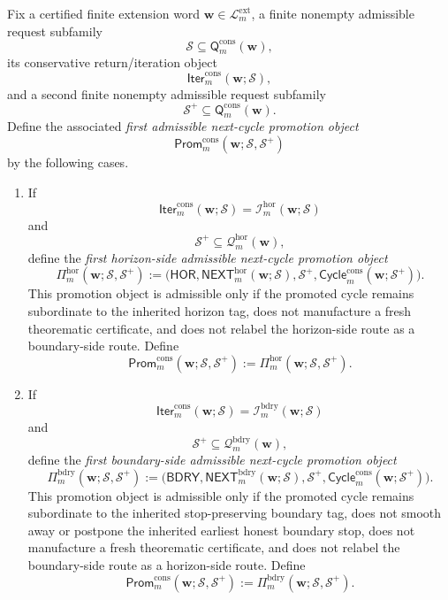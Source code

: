 \begin{definition}
\label{def:first-admissible-next-cycle-promotion-rule}
Fix a certified finite extension word \(\mathbf w\in\mathcal L^{\mathrm{ext}}_{m}\), a finite nonempty admissible request subfamily
\[
  \mathcal S \subseteq \mathsf{Q}^{\mathrm{cons}}_{m}(\mathbf w),
\]
its conservative return/iteration object
\[
  \mathsf{Iter}^{\mathrm{cons}}_{m}(\mathbf w;\mathcal S),
\]
and a second finite nonempty admissible request subfamily
\[
  \mathcal S^{+}\subseteq \mathsf{Q}^{\mathrm{cons}}_{m}(\mathbf w).
\]
Define the associated \emph{first admissible next-cycle promotion object}
\[
  \mathsf{Prom}^{\mathrm{cons}}_{m}(\mathbf w;\mathcal S,\mathcal S^{+})
\]
by the following cases.
\begin{enumerate}[label=(\roman*)]
  \item If
  \[
    \mathsf{Iter}^{\mathrm{cons}}_{m}(\mathbf w;\mathcal S)
    =
    \mathcal I^{\mathrm{hor}}_{m}(\mathbf w;\mathcal S)
  \]
and
\[
  \mathcal S^{+}\subseteq \mathcal Q^{\mathrm{hor}}_{m}(\mathbf w),
\]
define the \emph{first horizon-side admissible next-cycle promotion object}
\[
  \Pi^{\mathrm{hor}}_{m}(\mathbf w;\mathcal S,\mathcal S^{+})
  :=
  \bigl(
    \mathsf{HOR},
    \mathsf{NEXT}^{\mathrm{hor}}_{m}(\mathbf w;\mathcal S),
    \mathcal S^{+},
    \mathsf{Cycle}^{\mathrm{cons}}_{m}(\mathbf w;\mathcal S^{+})
  \bigr).
\]
This promotion object is admissible only if the promoted cycle remains subordinate to the inherited horizon tag, does not manufacture a fresh theorematic certificate, and does not relabel the horizon-side route as a boundary-side route. Define
\[
  \mathsf{Prom}^{\mathrm{cons}}_{m}(\mathbf w;\mathcal S,\mathcal S^{+})
  :=
  \Pi^{\mathrm{hor}}_{m}(\mathbf w;\mathcal S,\mathcal S^{+}).
\]

  \item If
  \[
    \mathsf{Iter}^{\mathrm{cons}}_{m}(\mathbf w;\mathcal S)
    =
    \mathcal I^{\mathrm{bdry}}_{m}(\mathbf w;\mathcal S)
  \]
and
\[
  \mathcal S^{+}\subseteq \mathcal Q^{\mathrm{bdry}}_{m}(\mathbf w),
\]
define the \emph{first boundary-side admissible next-cycle promotion object}
\[
  \Pi^{\mathrm{bdry}}_{m}(\mathbf w;\mathcal S,\mathcal S^{+})
  :=
  \bigl(
    \mathsf{BDRY},
    \mathsf{NEXT}^{\mathrm{bdry}}_{m}(\mathbf w;\mathcal S),
    \mathcal S^{+},
    \mathsf{Cycle}^{\mathrm{cons}}_{m}(\mathbf w;\mathcal S^{+})
  \bigr).
\]
This promotion object is admissible only if the promoted cycle remains subordinate to the inherited stop-preserving boundary tag, does not smooth away or postpone the inherited earliest honest boundary stop, does not manufacture a fresh theorematic certificate, and does not relabel the boundary-side route as a horizon-side route. Define
\[
  \mathsf{Prom}^{\mathrm{cons}}_{m}(\mathbf w;\mathcal S,\mathcal S^{+})
  :=
  \Pi^{\mathrm{bdry}}_{m}(\mathbf w;\mathcal S,\mathcal S^{+}).
\]
\end{enumerate}
\end{definition}

